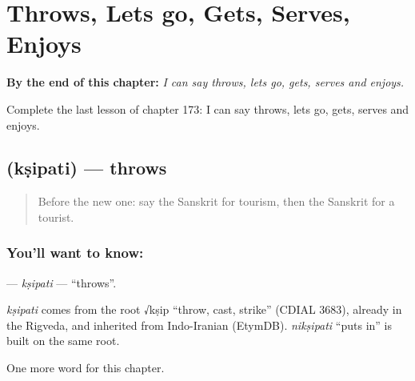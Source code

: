 
\chapter{Throws, Lets go, Gets, Serves, Enjoys}
\label{ch:sa-throws-lets-go-gets-serves-enjoys}

\begin{chapteropening}
\textbf{By the end of this chapter:} \emph{I can say throws, lets go, gets, serves and enjoys.}

Complete the last lesson of chapter 173: I can say throws, lets go, gets, serves and enjoys.
\end{chapteropening}

\section[\texorpdfstring{\sk{क्षिपति} (kṣipati)}{क्षिपति (kṣipati)}]{ (kṣipati) — throws}

\label{lesson:SA-C173-ksipati}



\begin{quote}
Before the new one: say the Sanskrit for tourism, then the Sanskrit for a tourist.
\end{quote}

\subsection*{You'll want to know: }
\textbf{} — \emph{kṣipati} — \textquotedblleft{}throws\textquotedblright{}.

\begin{cousinweb}
\emph{kṣipati} comes from the root √kṣip \textquotedblleft{}throw, cast, strike\textquotedblright{} (CDIAL 3683), already in the Rigveda, and inherited from Indo-Iranian (EtymDB). \emph{nikṣipati} \textquotedblleft{}puts in\textquotedblright{} is built on the same root.
\end{cousinweb}

\begin{grammarlens}[title={What you've built}]
One more word for this chapter.
\end{grammarlens}

